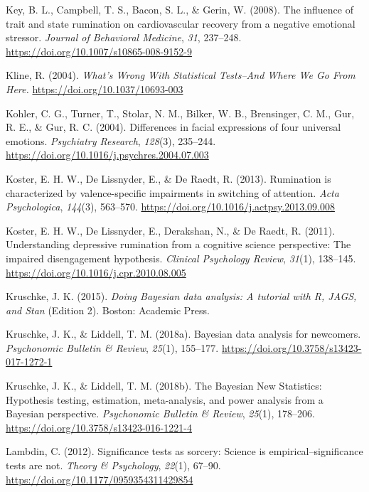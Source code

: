 \documentclass[a4paper,12pt,twoside,openright,oldfontcommands]{memoir}
\begin{document}
\hypertarget{ref-Key2008}{}
Key, B. L., Campbell, T. S., Bacon, S. L., \& Gerin, W. (2008). The
influence of trait and state rumination on cardiovascular recovery from
a negative emotional stressor. \emph{Journal of Behavioral Medicine},
\emph{31}, 237--248. \url{https://doi.org/10.1007/s10865-008-9152-9}

\hypertarget{ref-Kline2004}{}
Kline, R. (2004). \emph{What's Wrong With Statistical Tests--And Where
We Go From Here.} \url{https://doi.org/10.1037/10693-003}

\hypertarget{ref-kohler_differences_2004}{}
Kohler, C. G., Turner, T., Stolar, N. M., Bilker, W. B., Brensinger, C.
M., Gur, R. E., \& Gur, R. C. (2004). Differences in facial expressions
of four universal emotions. \emph{Psychiatry Research}, \emph{128}(3),
235--244. \url{https://doi.org/10.1016/j.psychres.2004.07.003}

\hypertarget{ref-Koster2013}{}
Koster, E. H. W., De Lissnyder, E., \& De Raedt, R. (2013). Rumination
is characterized by valence-specific impairments in switching of
attention. \emph{Acta Psychologica}, \emph{144}(3), 563--570.
\url{https://doi.org/10.1016/j.actpsy.2013.09.008}

\hypertarget{ref-Koster2011}{}
Koster, E. H. W., De Lissnyder, E., Derakshan, N., \& De Raedt, R.
(2011). Understanding depressive rumination from a cognitive science
perspective: The impaired disengagement hypothesis. \emph{Clinical
Psychology Review}, \emph{31}(1), 138--145.
\url{https://doi.org/10.1016/j.cpr.2010.08.005}

\hypertarget{ref-kruschke_doing_2015}{}
Kruschke, J. K. (2015). \emph{Doing Bayesian data analysis: A tutorial
with R, JAGS, and Stan} (Edition 2). Boston: Academic Press.

\hypertarget{ref-kruschke_bayesian_2018}{}
Kruschke, J. K., \& Liddell, T. M. (2018a). Bayesian data analysis for
newcomers. \emph{Psychonomic Bulletin \& Review}, \emph{25}(1),
155--177. \url{https://doi.org/10.3758/s13423-017-1272-1}

\hypertarget{ref-kruschke_bayesian_2018-1}{}
Kruschke, J. K., \& Liddell, T. M. (2018b). The Bayesian New Statistics:
Hypothesis testing, estimation, meta-analysis, and power analysis from a
Bayesian perspective. \emph{Psychonomic Bulletin \& Review},
\emph{25}(1), 178--206. \url{https://doi.org/10.3758/s13423-016-1221-4}

\hypertarget{ref-Lambdin2012}{}
Lambdin, C. (2012). Significance tests as sorcery: Science is
empirical--significance tests are not. \emph{Theory \& Psychology},
\emph{22}(1), 67--90. \url{https://doi.org/10.1177/0959354311429854}
\end{document}

